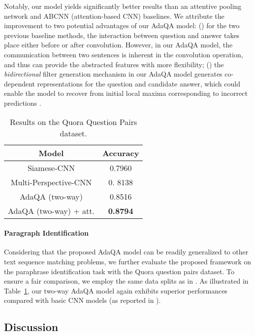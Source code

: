 \documentclass[11pt,a4paper]{article}
\begin{document}
Notably, our model yields significantly better results than an attentive pooling network and ABCNN (attention-based CNN) baselines. We attribute the improvement to two potential advantages of our AdaQA model: (\emph{}) for the two previous baseline methods, the interaction between question and answer takes place either before or after convolution. However, in our AdaQA model, the communication between two sentences is inherent in the convolution operation, and thus can provide the abstracted features with more flexibility; (\emph{}) the \emph{bidirectional} filter generation mechanism in our AdaQA model generates co-dependent representations for the question and candidate answer, which could enable the model to recover from initial local maxima corresponding to incorrect predictions \cite{xiong2016dynamic}. 


\begin{table} \centering
	\begin{tabular}{c|c}
		\toprule[1.2pt]
		\textbf{Model} &  \textbf{Accuracy}    \\
		\hline
		Siamese-CNN      & 0.7960 \\
		Multi-Perspective-CNN    & 0. 8138 \\
		\hline
		AdaQA (two-way)  & 0.8516   \\ 
		AdaQA (two-way) + att. & \textbf{0.8794}   \\ 
		\bottomrule[1.2pt]
	\end{tabular}
	\vspace{-2mm}
	\caption{\small Results on the Quora Question Pairs dataset.}
	\label{tab:quora}
	\vspace{-5mm}
\end{table}
\vspace{-2mm}
\paragraph{Paragraph Identification} Considering that the proposed AdaQA model can be readily generalized to other text sequence matching problems, we further evaluate the proposed framework on the paraphrase identification task with the Quora question pairs dataset. To ensure a fair comparison, we employ the same data splits as in \cite{wang2017bilateral}. As illustrated in Table~\ref{tab:quora}, our two-way AdaQA model  again exhibits superior performances compared with basic CNN models (as reported in \cite{wang2017bilateral}).


\subsection{Discussion}
\vspace{-1mm}
\end{document}
